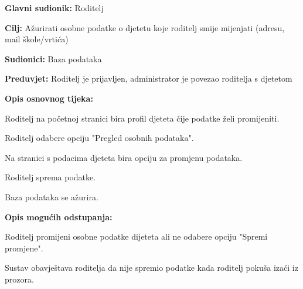 					\noindent {}
					\begin{packed_item}
						
						\item \textbf{Glavni sudionik: }Roditelj
						\item  \textbf{Cilj:} Ažurirati osobne podatke o djetetu koje roditelj smije mijenjati (adresu, mail škole/vrtića)
						\item  \textbf{Sudionici:} Baza podataka
						\item  \textbf{Preduvjet:} Roditelj je prijavljen, administrator je povezao roditelja s djetetom
						\item  \textbf{Opis osnovnog tijeka:}
						
						\item[] \begin{packed_enum}
							
							\item Roditelj na početnoj stranici bira profil djeteta čije podatke želi promijeniti. 
							\item Roditelj odabere opciju "Pregled osobnih podataka".
							\item Na stranici s podacima djeteta bira opciju za promjenu podataka.
							\item Roditelj sprema podatke.
							\item Baza podataka se ažurira.
						\end{packed_enum}
						
						\item  \textbf{Opis mogućih odstupanja:}
						
						\item[] \begin{packed_item}
							
							\item[4.a] Roditelj promijeni osobne podatke dijeteta ali ne odabere opciju "Spremi promjene".
							\item[] \begin{packed_enum}
								
								\item Sustav obavještava roditelja da nije spremio podatke kada roditelj pokuša izaći iz prozora.
							\end{packed_enum}
							
						\end{packed_item}
					\end{packed_item}
					
